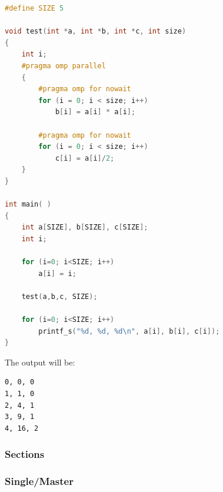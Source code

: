 \begin{itemize}
\begin{examplebox}
\begin{lstlisting}[language=C++]
#define SIZE 5

void test(int *a, int *b, int *c, int size)
{
    int i;
    #pragma omp parallel
    {
        #pragma omp for nowait
        for (i = 0; i < size; i++)
            b[i] = a[i] * a[i];

        #pragma omp for nowait
        for (i = 0; i < size; i++)
            c[i] = a[i]/2;
    }
}

int main( )
{
    int a[SIZE], b[SIZE], c[SIZE];
    int i;

    for (i=0; i<SIZE; i++)
        a[i] = i;

    test(a,b,c, SIZE);

    for (i=0; i<SIZE; i++)
        printf_s("%d, %d, %d\n", a[i], b[i], c[i]);
}\end{lstlisting}
    The output will be:
\begin{lstlisting}
0, 0, 0
1, 1, 0
2, 4, 1
3, 9, 1
4, 16, 2\end{lstlisting}
    \end{examplebox}
\end{itemize}

\newpage

\subsubsection{Sections}

\subsubsection{Single/Master}